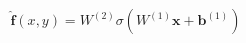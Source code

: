 \documentclass[preview]{standalone}
\begin{document}
\begin{align*}
\hat{\mathbf{f}}(x,y) = W^{(2)} \sigma\left(W^{(1)} \mathbf{x} + \mathbf{b}^{(1)}\right)
\end{align*}
\end{document}
